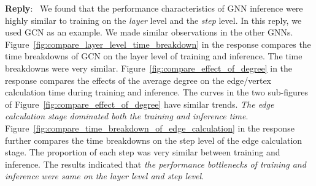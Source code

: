 \documentclass[12pt]{article}
\newenvironment{reply}
   {\medskip \noindent \textbf{Reply}:\  }
   {\medskip}
\begin{document}
\begin{reply}
    We found that the performance characteristics of GNN inference were highly similar to training on the \emph{layer} level and the \emph{step} level.
    In this reply, we used GCN as an example.
    We made similar observations in the other GNNs.
    Figure~\ref{fig:compare_layer_level_time_breakdown} in the response compares the time breakdowns of GCN on the layer level of training and inference.
    The time breakdowns were very similar.
    Figure~\ref{fig:compare_effect_of_degree} in the response compares the effects of the average degree on the edge/vertex calculation time during training and inference.
    The curves in the two sub-figures of Figure~\ref{fig:compare_effect_of_degree} have similar trends.
    \emph{The edge calculation stage dominated both the training and inference time}.
    Figure~\ref{fig:compare_time_breakdown_of_edge_calculation} in the response further compares the time breakdowns on the step level of the edge calculation stage.
    The proportion of each step was very similar between training and inference.
    The results indicated that \emph{the performance bottlenecks of training and inference were same on the layer level and step level}.


\end{reply}
\end{document}
